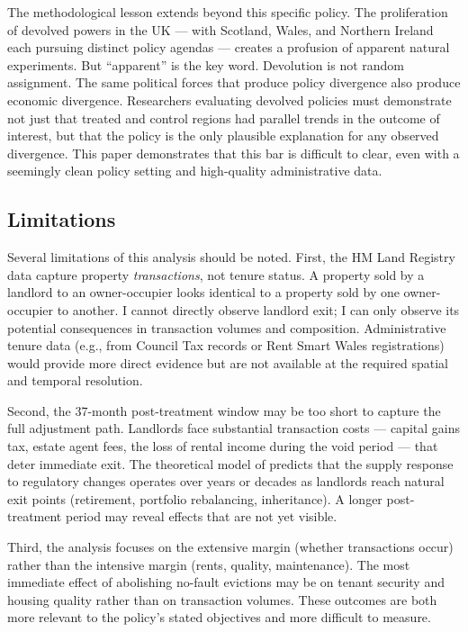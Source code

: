 \documentclass[12pt]{article}
\begin{document}
The methodological lesson extends beyond this specific policy. The proliferation of devolved powers in the UK --- with Scotland, Wales, and Northern Ireland each pursuing distinct policy agendas --- creates a profusion of apparent natural experiments. But ``apparent'' is the key word. Devolution is not random assignment. The same political forces that produce policy divergence also produce economic divergence. Researchers evaluating devolved policies must demonstrate not just that treated and control regions had parallel trends in the outcome of interest, but that the policy is the only plausible explanation for any observed divergence. This paper demonstrates that this bar is difficult to clear, even with a seemingly clean policy setting and high-quality administrative data.

\subsection{Limitations}

Several limitations of this analysis should be noted. First, the HM Land Registry data capture property \textit{transactions}, not tenure status. A property sold by a landlord to an owner-occupier looks identical to a property sold by one owner-occupier to another. I cannot directly observe landlord exit; I can only observe its potential consequences in transaction volumes and composition. Administrative tenure data (e.g., from Council Tax records or Rent Smart Wales registrations) would provide more direct evidence but are not available at the required spatial and temporal resolution.

Second, the 37-month post-treatment window may be too short to capture the full adjustment path. Landlords face substantial transaction costs --- capital gains tax, estate agent fees, the loss of rental income during the void period --- that deter immediate exit. The theoretical model of \citet{arnott1995time} predicts that the supply response to regulatory changes operates over years or decades as landlords reach natural exit points (retirement, portfolio rebalancing, inheritance). A longer post-treatment period may reveal effects that are not yet visible.

Third, the analysis focuses on the extensive margin (whether transactions occur) rather than the intensive margin (rents, quality, maintenance). The most immediate effect of abolishing no-fault evictions may be on tenant security and housing quality rather than on transaction volumes. These outcomes are both more relevant to the policy's stated objectives and more difficult to measure.
\end{document}

